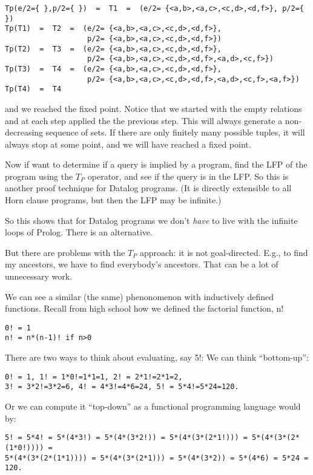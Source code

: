 \begin{verbatim}
Tp(e/2={ },p/2={ })  =  T1  =  (e/2= {<a,b>,<a,c>,<c,d>,<d,f>}, p/2={ })
Tp(T1)  =  T2  =  (e/2= {<a,b>,<a,c>,<c,d>,<d,f>}, 
                   p/2= {<a,b>,<a,c>,<c,d>,<d,f>})
Tp(T2)  =  T3  =  (e/2= {<a,b>,<a,c>,<c,d>,<d,f>}, 
                   p/2= {<a,b>,<a,c>,<c,d>,<d,f>,<a,d>,<c,f>})
Tp(T3)  =  T4  =  (e/2= {<a,b>,<a,c>,<c,d>,<d,f>}, 
                   p/2= {<a,b>,<a,c>,<c,d>,<d,f>,<a,d>,<c,f>,<a,f>})
Tp(T4)  =  T4
\end{verbatim}
and we reached the fixed point.  Notice that we started with the empty
relations and at each step applied the %
the previous step.  This will always generate a non-decreasing
sequence of sets. If there are only finitely many possible tuples, it
will always stop at some point, and we will have reached a fixed
point.

Now if want to determine if a query is implied by a program, find the
LFP of the program using the $T_P$ operator, and see if the query is in
the LFP.  So this is another proof technique for Datalog programs.
(It is directly extensible to all Horn clause programs, but then the
LFP may be infinite.)

So this shows that for Datalog programs we don't {\em have} to live
with the infinite loops of Prolog.  There is an alternative.  

But there are problems with the $T_P$ approach: it is not goal-directed.
E.g., to find my ancestors, we have to find everybody's ancestors.
That can be a lot of unnecessary work.

We can see a similar (the same) phenonomenon with inductively defined
functions.  Recall from high school how we defined the factorial
function, n!

\begin{verbatim}
0! = 1
n! = n*(n-1)! if n>0
\end{verbatim}

There are two ways to think about evaluating, say 5!: We can think
``bottom-up'': 
\begin{verbatim}
0! = 1, 1! = 1*0!=1*1=1, 2! = 2*1!=2*1=2, 
3! = 3*2!=3*2=6, 4! = 4*3!=4*6=24, 5! = 5*4!=5*24=120.
\end{verbatim}

Or we can compute it ``top-down'' as a functional programming language
would by:
\begin{verbatim}
5! = 5*4! = 5*(4*3!) = 5*(4*(3*2!)) = 5*(4*(3*(2*1!))) = 5*(4*(3*(2*(1*0!)))) = 
5*(4*(3*(2*(1*1)))) = 5*(4*(3*(2*1))) = 5*(4*(3*2)) = 5*(4*6) = 5*24 = 120.
\end{verbatim}

